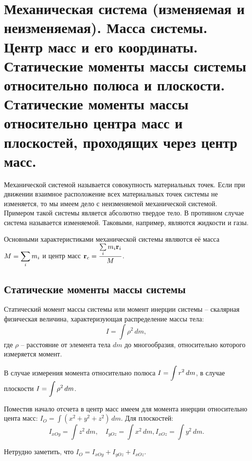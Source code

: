 \chapter{Механическая система (изменяемая и неизменяемая). Масса системы. Центр
масс и его координаты. Статические моменты массы системы относительно
полюса и плоскости. Статические моменты массы относительно центра масс и
плоскостей, проходящих через центр масс.}

Механической системой называется совокупность материальных точек. Если при
движении взаимное расположение всех материальных точек системы не изменяется, то
мы имеем дело с неизменяемой механической системой. Примером такой системы
является абсолютно твердое тело. В противном случае система называется
изменяемой. Таковыми, например, являются жидкости и газы.

Основными характеристиками механической системы являются её масса
\( \displaystyle M = \sum_i m_i \) и центр масс \( \displaystyle \mathbf{r}_c =
\frac{\sum\limits_i m_i\mathbf{r}_i}{M} \).

\section{Статические моменты массы системы}
Статический момент массы системы или момент инерции системы -- скалярная
физическая величина, характеризующая распределение массы тела:
\[
    I = \int \rho^2\,dm,
\]
где \( \rho \) -- расстояние от элемента тела \( dm \) до многообразия,
относительно которого измеряется момент.

В случае измерения момента относительно полюса \( \displaystyle I = \int r^2\,dm \), в случае
плоскости \( \displaystyle I = \int \rho^2\,dm \).

Поместив начало отсчета в центр масс имеем для момента инерции относительно
цента масс: \( I_O = \int (x^2 + y^2 + z^2)\,dm \). Для плоскостей:
\[
    I_{xOy} = \int z^2\,dm, \quad I_{yOz} = \int x^2\,dm,
    I_{xOz} = \int y^2\,dm.
\]

Нетрудно заметить, что \( I_O = I_{xOy} + I_{yOz} + I_{xOz} \).


\newpage %
